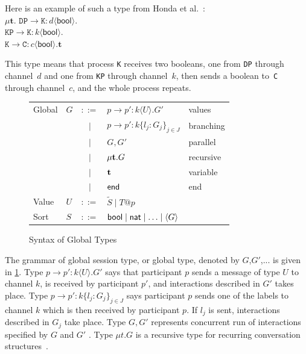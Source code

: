 \documentclass[a4paper,12pt,oneside,fleqn]{book} %
\begin{document}
{\def\l#1->#2:#3<#4>{\mathtt{#1}\to\mathtt{#2}:#3\langle\mathsf{#4}\rangle}

Here is an example of such a type from
Honda et al.~\cite{dblp:conf/popl/hondayc08}:\\
  $\mu\mathbf{t}.$
  $\l DP->K:d<bool>. $\\
  $\l KP->K:k<bool>. $\\
  $\l K->C:c<bool>.\mathbf{t}$

This type means that process \texttt{K} receives two booleans, one from
\texttt{DP} through channel~$d$ and one from \texttt{KP} through channel~$k$,
then sends a boolean to~\texttt{C} through channel~$c$, and the whole process
repeats.

\begin{figure}\footnotesize %
\begin{center}
\begin{tabular}{llcll}
  Global & $G$ & $::=$ & $p \to p' : k\langle U\rangle.G'$ & values
  \\  && $\mid$ & $p\to p' : k \{l_j : G_j\}_{j\in J}$  & branching
  \\ && $\mid$  & $G,G'$ & parallel
  \\ && $\mid$ & $\mu {\bf t}. G$ & recursive
  \\ && $\mid$ & ${\bf t}$ & variable
  \\ && $\mid$ & ${\sf end}$ & end
\\
Value & $U$ & $::=$ & $\tilde S \mid T@p$
\\
Sort & $S$ & $::=$ & ${\sf bool}\mid {\sf nat}\mid\ldots\mid\langle G\rangle$
\end{tabular}
\end{center}
\caption{Syntax of Global Types~\cite{DBLP:journals/jacm/HondaYC16}}
\label{fig:globalType}
\end{figure} %

The grammar of global session type, or global type, denoted by $G$,$G'$,...
is given in \ref{fig:globalType}. Type $p \to p' : k\langle U\rangle.G'$
says that participant $p$ sends a message of type $U$ to channel $k$, is
received by participant $p'$, and interactions described in $G'$ takes
place. Type $p\to p' : k \{l_j : G_j\}_{j\in J}$ says participant $p$ sends
one of the labels to channel $k$ which is then received by participant $p$.
If $l_j$ is sent, interactions described in $G_j$ take place.  Type $G,G'$
represents concurrent run of interactions specified by $G$ and $G'$ . Type
$μt.G$ is a recursive type for recurring conversation structures~\cite{DBLP:journals/jacm/HondaYC16}.


}
\end{document}
